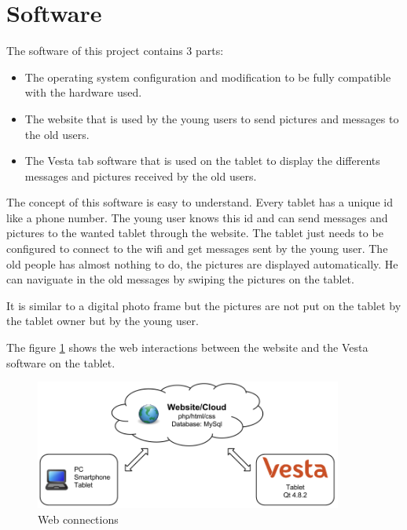 \section{Software}
The software of this project contains 3 parts:
\begin{itemize}
\item{The operating system configuration and modification to be fully compatible with the hardware used.}
\item{The website that is used by the young users to send pictures and messages to the old users.}
\item{The Vesta tab software that is used on the tablet to display the differents messages and pictures received by the old users.}
\end{itemize}

The concept of this software is easy to understand. Every tablet has a unique id like a phone number. The young user knows this id and can send messages and pictures to the wanted tablet through the website. The tablet just needs to be configured to connect to the wifi and get messages sent by the young user. The old people has almost nothing to do, the pictures are displayed automatically. He can naviguate in the old messages by swiping the pictures on the tablet.

It is similar to a digital photo frame but the pictures are not put on the tablet by the tablet owner but by the young user.

The figure \ref{fig:web connections} shows the web interactions between the website and the Vesta software on the tablet.

\begin{figure}[!htb]
    \centering
    \includegraphics[width=0.9\textwidth,keepaspectratio]{chap/softFig/web_connections.png}
    \caption{Web connections}
    \label{fig:web connections}
\end{figure}

